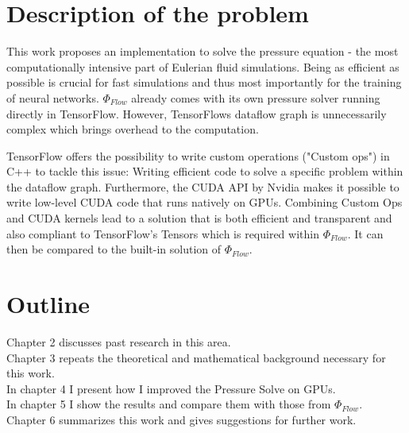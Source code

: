 \section{Description of the problem}
This work proposes an implementation to solve the pressure equation - the most computationally intensive part of Eulerian fluid simulations. Being as efficient as possible is crucial for fast simulations and thus most importantly for the training of neural networks. $\Phi_\textit{Flow}$ already comes with its own pressure solver running directly in TensorFlow. However, TensorFlows dataflow graph is unnecessarily complex which brings overhead to the computation.
\par TensorFlow offers the possibility to write custom operations ("Custom ops") in C++ to tackle this issue: Writing efficient code to solve a specific problem within the dataflow graph. Furthermore, the CUDA API by Nvidia makes it possible to write low-level CUDA code that runs natively on GPUs. Combining Custom Ops and CUDA kernels lead to a solution that is both efficient and transparent and also compliant to TensorFlow's Tensors which is required within $\Phi_\textit{Flow}$. It can then be compared to the built-in solution of $\Phi_\textit{Flow}$.
\section{Outline}
Chapter 2 discusses past research in this area.\\
Chapter 3 repeats the theoretical and mathematical background necessary for this work.\\
In chapter 4 I present how I improved the Pressure Solve on GPUs.\\
In chapter 5 I show the results and compare them with those from $\Phi_\textit{Flow}$.\\
Chapter 6 summarizes this work and gives suggestions for further work.\\


